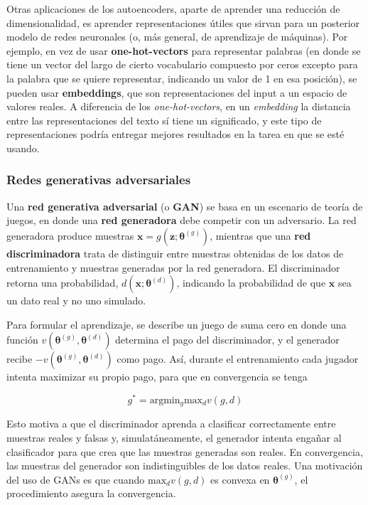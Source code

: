 Otras aplicaciones de los autoencoders, aparte de aprender una reducci\'on de dimensionalidad, es aprender representaciones \'utiles que sirvan para un posterior modelo de redes neuronales (o, m\'as general, de aprendizaje de m\'aquinas). Por ejemplo, en vez de usar \textbf{one-hot-vectors} para representar palabras (en donde se tiene un vector del largo de cierto vocabulario compuesto por ceros excepto para la palabra que se quiere representar, indicando un valor de 1 en esa posici\'on), se pueden usar \textbf{embeddings}, que son representaciones del input a un espacio de valores reales. A diferencia de los \textit{one-hot-vectors}, en un \textit{embedding} la distancia entre las representaciones del texto s\'i tiene un significado, y este tipo de representaciones podr\'ia entregar mejores resultados en la tarea en que se est\'e usando.

\subsubsection{Redes generativas adversariales}

Una \textbf{red generativa adversarial} (o \textbf{GAN}) se basa en un escenario de teor\'ia de juegos, en donde una \textbf{red generadora} debe competir con un adversario. La red generadora produce muestras $\bm{x} = g(\bm{z};\bm{\theta}^{(g)})$, mientras que una \textbf{red discriminadora} trata de distinguir entre muestras obtenidas de los datos de entrenamiento y muestras generadas por la red generadora. El discriminador retorna una probabilidad, $d(\bm{x};\bm{\theta}^{(d)})$, indicando la probabilidad de que $\bm{x}$ sea un dato real y no uno simulado.

Para formular el aprendizaje, se describe un juego de suma cero en donde una funci\'on $v(\bm{\theta}^{(g)},\bm{\theta}^{(d)})$ determina el pago del discriminador, y el generador recibe $-v(\bm{\theta}^{(g)},\bm{\theta}^{(d)})$ como pago. As\'i, durante el entrenamiento cada jugador intenta maximizar su propio pago, para que en convergencia se tenga

\begin{equation}
g^{*} = \textrm{arg} \textrm{min}_{g} \textrm{max}_{d} v(g,d)
\end{equation}

Esto motiva a que el discriminador aprenda a clasificar correctamente entre muestras reales y falsas y, simulat\'aneamente, el generador intenta enga{\~{n}}ar al clasificador para que crea que las muestras generadas son reales. En convergencia, las muestras del generador son indistinguibles de los datos reales. Una motivaci\'on del uso de GANs es que cuando $\textrm{max}_{d} v(g,d)$ es convexa en $\bm{\theta}^{(g)}$, el procedimiento asegura la convergencia.

